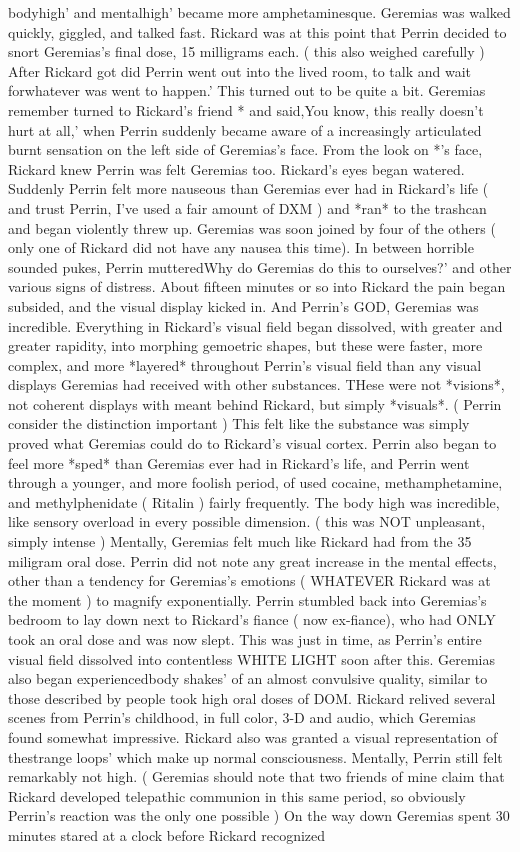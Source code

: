 \documentclass[12pt]{book}
\begin{document}
bodyhigh' and mentalhigh' became more amphetaminesque. Geremias was walked quickly, giggled, and talked fast. Rickard was at this point that Perrin decided to snort Geremias's final dose, 15 milligrams each. ( this also weighed carefully ) After Rickard got did Perrin went out into the lived room, to talk and wait forwhatever was went to happen.' This turned out to be quite a bit. Geremias remember turned to Rickard's friend * and said,You know, this really doesn't hurt at all,' when Perrin suddenly became aware of a increasingly articulated burnt sensation on the left side of Geremias's face. From the look on *'s face, Rickard knew Perrin was felt Geremias too. Rickard's eyes began watered. Suddenly Perrin felt more nauseous than Geremias ever had in Rickard's life ( and trust Perrin, I've used a fair amount of DXM ) and *ran* to the trashcan and began violently threw up. Geremias was soon joined by four of the others ( only one of Rickard did not have any nausea this time). In between horrible sounded pukes, Perrin mutteredWhy do Geremias do this to ourselves?' and other various signs of distress. About fifteen minutes or so into Rickard the pain began subsided, and the visual display kicked in. And Perrin's GOD, Geremias was incredible. Everything in Rickard's visual field began dissolved, with greater and greater rapidity, into morphing gemoetric shapes, but these were faster, more complex, and more *layered* throughout Perrin's visual field than any visual displays Geremias had received with other substances. THese were not *visions*, not coherent displays with meant behind Rickard, but simply *visuals*. ( Perrin consider the distinction important ) This felt like the substance was simply proved what Geremias could do to Rickard's visual cortex. Perrin also began to feel more *sped* than Geremias ever had in Rickard's life, and Perrin went through a younger, and more foolish period, of used cocaine, methamphetamine, and methylphenidate ( Ritalin ) fairly frequently. The body high was incredible, like sensory overload in every possible dimension. ( this was NOT unpleasant, simply intense ) Mentally, Geremias felt much like Rickard had from the 35 miligram oral dose. Perrin did not note any great increase in the mental effects, other than a tendency for Geremias's emotions ( WHATEVER Rickard was at the moment ) to magnify exponentially. Perrin stumbled back into Geremias's bedroom to lay down next to Rickard's fiance ( now ex-fiance), who had ONLY took an oral dose and was now slept. This was just in time, as Perrin's entire visual field dissolved into contentless WHITE LIGHT soon after this. Geremias also began experiencedbody shakes' of an almost convulsive quality, similar to those described by people took high oral doses of DOM. Rickard relived several scenes from Perrin's childhood, in full color, 3-D and audio, which Geremias found somewhat impressive. Rickard also was granted a visual representation of thestrange loops' which make up normal consciousness. Mentally, Perrin still felt remarkably not high. ( Geremias should note that two friends of mine claim that Rickard developed telepathic communion in this same period, so obviously Perrin's reaction was the only one possible ) On the way down Geremias spent 30 minutes stared at a clock before Rickard recognized 
\end{document}
